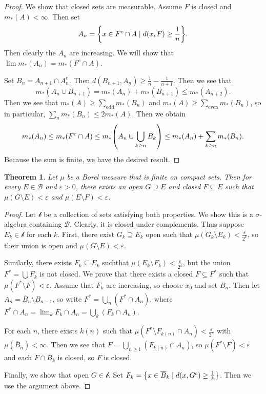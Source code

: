 \documentclass[leqno, openany]{memoir}
\newtheorem{thm}{Theorem}[chapter]
\theoremstyle{definition}
\theoremstyle{remark}
\theoremstyle{plain}
\theoremstyle{definition}
\theoremstyle{remark}
\newcommand{\ep}{\varepsilon}
\newcommand{\mc}[1]{\mathcal{#1}}
\newcommand{\mr}[1]{\mathrm{#1}}
\newcommand{\ol}[1]{\overline{#1}}
\begin{document}
\begin{proof} We show that closed sets are measurable. Assume $F$ is closed and
    $m_*(A) < \infty$. Then set \[ A_n = \qty{x \in F^c \cap A \mid d(x,F) \geq
    \frac{1}{n}}. \] Then clearly the $A_n$ are increasing. We will show that
    $\lim m_*(A_n) = m_*(F^c \cap A)$.

    Set $B_n = A_{n+1} \cap A_n^c$. Then $d(B_{n+1}, A_n) \geq \frac{1}{n} -
    \frac{1}{n+1}$. Then we see that \[ m_*(A_n \cup B_{n+1}) = m_*(A_n) +
    m_*(B_{n+1}) \leq m_*(A_{n+2}). \] Then we see that $m_*(A) \geq
    \sum_{\mr{odd}} m_*(B_n)$ and $m_*(A) \geq \sum_{\mr{even}} m_*(B_n)$, so
    in particular, $\sum_n m_*(B_n) \leq 2m_*(A)$. Then we obtain \[ m_*(A_n)
    \leq m_*(F^c \cap A) \leq m_* \qty(A_n \cup \bigcup_{k\geq n} B_k) \leq
m_*(A_n) + \sum_{k \geq n} m_*(B_n). \] Because the sum is finite, we have the
desired result.  \end{proof}

\begin{thm} Let $\mu$ be a Borel measure that is finite on compact sets. Then
    for every $E \in \mc{B}$ and $\ep > 0$, there exists an open $G\supseteq E$
    and closed $F \subseteq E$ such that $\mu(G \setminus E) < \ep$ and $\mu(E
    \setminus F) < \ep$.  \end{thm}

\begin{proof} Let $\mc{b}$ be a collection of sets satisfying both properties.
    We show this is a $\sigma$-algebra containing $\mc{B}$. Clearly, it is
    closed under complements. Thus suppose $E_k \in \mc{b}$ for each $k$.
    First, there exist $G_k \supseteq E_k$ open such that $\mu(G_k \setminus
    E_k) < \frac{\ep}{2^k}$, so their union is open and $\mu(G \setminus E) <
    \ep$.

    Similarly, there exists $F_k \subseteq E_k$ suchthat $\mu(E_k \setminus
    F_k) < \frac{\ep}{2^k}$, but the union $F^* = \bigcup F_k$ is not closed.
    We prove that there exists a closed $F \subseteq F^*$ such that $\mu(F^*
    \setminus F) < \ep$. Assume that $F_k$ are increasing, so choose $x_0$ and
    set $B_n$. Then let $A_n = \ol{B}_n \setminus B_{n-1}$, so write $F^* =
    \bigcup_n (F^* \cap A_n)$, where $F^* \cap A_n = \lim_k F_k \cap A_n =
    \bigcup_k (F_k \cap A_n)$.

    For each $n$, there exists $k(n)$ such that $\mu(F^* \setminus F_{k(n)}
    \cap A_n) < \frac{\ep}{2^n}$ with $\mu(\ol{B}_n) < \infty$. Then we see
    that $F = \bigcup_{n \geq 1} (F_{k(n)} \cap A_n)$, so $\mu(F^* \setminus F)
    < \ep$ and each $F \cap \ol{B}_k$ is closed, so $F$ is closed.

    Finally, we show that open $G \in \mc{b}$. Set $F_k = \qty{x \in \ol{B}_k
\mid d(x,G^c) \geq \frac{1}{k}}$. Then we use the argument above.  \end{proof}
\end{document}
